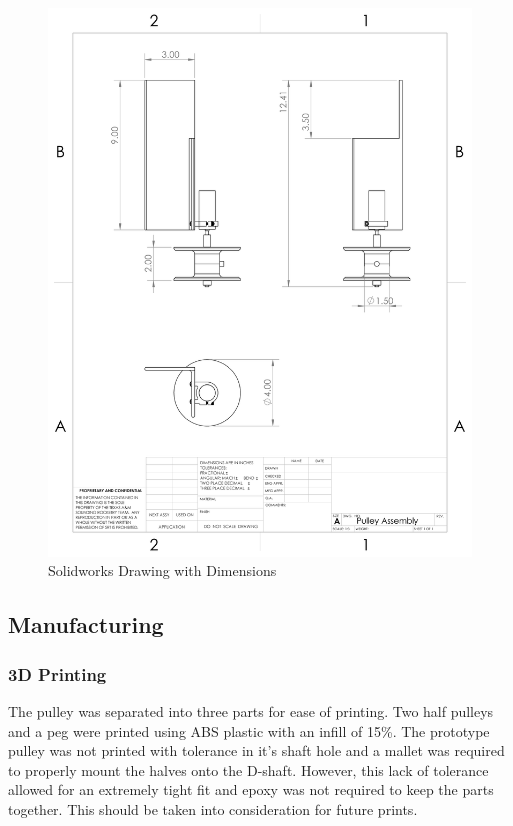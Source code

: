 \documentclass[10pt,a4paper]{article}
\begin{document}
\begin{figure}[h!]
	\centering
	\includegraphics[width=1.0\textwidth]{./figs/qd_draw.png}
	\caption{Solidworks Drawing with Dimensions}
	\label{fig:qd_draw}
\end{figure}

\newpage
\subsection{Manufacturing}

\subsubsection{3D Printing}
The pulley was separated into three parts for ease of printing. Two half pulleys and a peg were printed using ABS plastic with an infill of 15\%. The prototype pulley was not printed with tolerance in it's shaft hole and a mallet was required to properly mount the halves onto the D-shaft. However, this lack of tolerance allowed for an extremely tight fit and epoxy was not required to keep the parts together. This should be taken into consideration for future prints.
\end{document}
